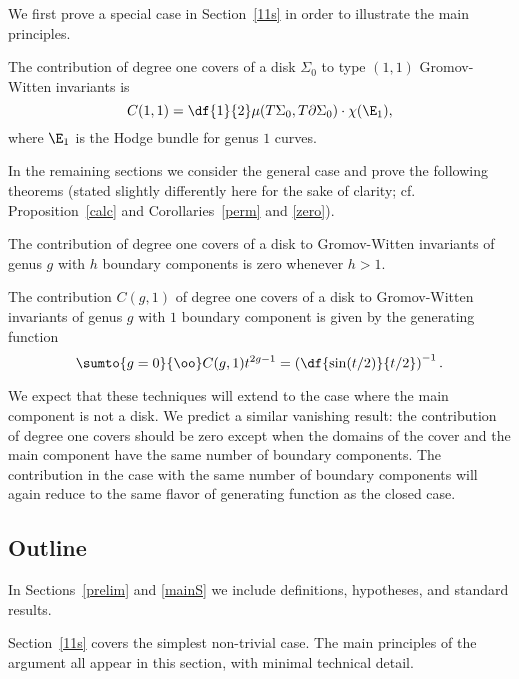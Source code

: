 We first prove a special case in Section~\ref{11s} in order to illustrate the main principles.

{
\renewcommand{\thetheorem}{\ref{calc11}}
\begin{theorem}
The contribution of degree one covers of a disk $\Sigma_0$ to type $(1,1)$ Gromov-Witten invariants is
\[
C(1,1) = \df{1}{2} \mu(T\Sigma_0,T\partial\Sigma_0) \cdot \chi(\E_1),
\]
where $\E_1$ is the Hodge bundle for genus $1$ curves.
\end{theorem}
\addtocounter{theorem}{-1}
}

In the remaining sections we consider the general case and prove the following theorems (stated slightly differently here for the sake of clarity; cf. Proposition~\ref{calc} and Corollaries~\ref{perm} and \ref{zero}).

\begin{theorem}
The contribution of degree one covers of a disk to Gromov-Witten invariants of genus $g$ with $h$ boundary components is zero whenever $h>1$.
\end{theorem}

\begin{theorem}
The contribution $C(g,1)$ of degree one covers of a disk to Gromov-Witten invariants of genus $g$ with $1$ boundary component is given by the generating function
\[
\sumto{g=0}{\oo} C(g,1)t^{2g-1} = \left( \df{\sin(t/2)}{t/2} \right)^{-1}.
\]
\end{theorem}

\begin{remark}
We expect that these techniques will extend to the case where the main component is not a disk. We predict a similar vanishing result: the contribution of degree one covers should be zero except when the domains of the cover and the main component have the same number of boundary components. The contribution in the case with the same number of boundary components will again reduce to the same flavor of generating function as the closed case.
\end{remark}

\subsection{Outline}

In Sections~\ref{prelim} and \ref{mainS} we include definitions, hypotheses, and standard results.

Section~\ref{11s} covers the simplest non-trivial case. The main principles of the argument all appear in this section, with minimal technical detail.

